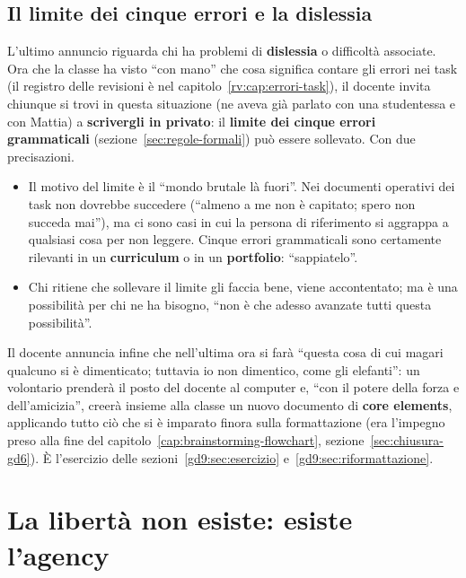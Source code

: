 \subsection{Il limite dei cinque errori e la dislessia}

L'ultimo annuncio riguarda chi ha problemi di \textbf{dislessia} o difficoltà
associate. Ora che la classe ha visto ``con mano'' che cosa significa contare
gli errori nei task (il registro delle revisioni è nel
capitolo~\ref{rv:cap:errori-task}), il docente invita chiunque si trovi in
questa situazione (ne aveva già parlato con una studentessa e con Mattia) a
\textbf{scrivergli in privato}: il \textbf{limite dei cinque errori
grammaticali} (sezione~\ref{sec:regole-formali}) può essere sollevato. Con
due precisazioni.
\begin{itemize}
  \item Il motivo del limite è il ``mondo brutale là fuori''. Nei documenti
        operativi dei task non dovrebbe succedere (``almeno a me non è
        capitato; spero non succeda mai''), ma ci sono casi in cui la persona
        di riferimento si aggrappa a qualsiasi cosa per non leggere. Cinque
        errori grammaticali sono certamente rilevanti in un
        \textbf{curriculum} o in un \textbf{portfolio}: ``sappiatelo''.
  \item Chi ritiene che sollevare il limite gli faccia bene, viene
        accontentato; ma è una possibilità per chi ne ha bisogno, ``non è
        che adesso avanzate tutti questa possibilità''.
\end{itemize}

Il docente annuncia infine che nell'ultima ora si farà ``questa cosa di cui
magari qualcuno si è dimenticato; tuttavia io non dimentico, come gli
elefanti'': un volontario prenderà il posto del docente al computer e, ``con
il potere della forza e dell'amicizia'', creerà insieme alla classe un nuovo
documento di \textbf{core elements}, applicando tutto ciò che si è imparato
finora sulla formattazione (era l'impegno preso alla fine del
capitolo~\ref{cap:brainstorming-flowchart}, sezione~\ref{sec:chiusura-gd6}).
È l'esercizio delle sezioni~\ref{gd9:sec:esercizio}
e~\ref{gd9:sec:riformattazione}.

\section{La libertà non esiste: esiste l'agency}
\label{gd9:sec:agency}

